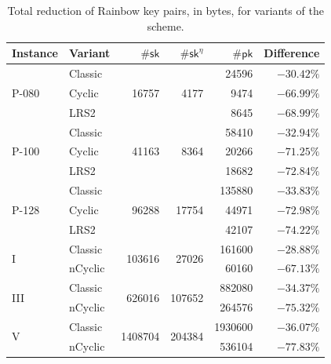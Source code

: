 \documentclass[english]{ufsc-thesis-rn46-2019/ufsc-thesis-rn46-2019}
\theoremstyle{definition}
\begin{document}
\begin{table}[htbp]
  \renewcommand{\arraystretch}{1.2}
  \centering
  \caption{Total reduction of Rainbow key pairs, in bytes, for variants of the
    scheme.}\label{tab:pair-diff}
  \begin{tabular}{*{2}{l}*{4}{r}}
    \toprule
    Instance               & Variant & $\#\mathsf{sk}$
      & $\#\mathsf{sk}^{\eta}$         & $\#\mathsf{pk}$ & Difference \\
    \midrule
    \multirow{3}{*}{P-080} & Classic & \multirow{3}{*}{\num{  16757}}
      & \multirow{3}{*}{\num{   4177}} & \num{   24596}  & $-30.42\%$ \\
                           & Cyclic  &
      &                                & \num{    9474}  & $-66.99\%$ \\
                           & LRS2    &
      &                                & \num{    8645}  & $-68.99\%$ \\
    \multirow{3}{*}{P-100} & Classic & \multirow{3}{*}{\num{  41163}}
      & \multirow{3}{*}{\num{   8364}} & \num{   58410}  & $-32.94\%$ \\
                           & Cyclic  &
      &                                & \num{   20266}  & $-71.25\%$ \\
                           & LRS2    &
      &                                & \num{   18682}  & $-72.84\%$ \\
    \multirow{3}{*}{P-128} & Classic & \multirow{3}{*}{\num{  96288}}
      & \multirow{3}{*}{\num{  17754}} & \num{  135880}  & $-33.83\%$ \\
                           & Cyclic  &
      &                                & \num{   44971}  & $-72.98\%$ \\
                           & LRS2    &
      &                                & \num{   42107}  & $-74.22\%$ \\
    \multirow{2}{*}{I    } & Classic & \multirow{2}{*}{\num{ 103616}}
      & \multirow{2}{*}{\num{  27026}} & \num{  161600}  & $-28.88\%$ \\
                           & nCyclic &
      &                                & \num{   60160}  & $-67.13\%$ \\
    \multirow{2}{*}{III  } & Classic & \multirow{2}{*}{\num{ 626016}}
      & \multirow{2}{*}{\num{ 107652}} & \num{  882080}  & $-34.37\%$ \\
                           & nCyclic &
      &                                & \num{  264576}  & $-75.32\%$ \\
    \multirow{2}{*}{V    } & Classic & \multirow{2}{*}{\num{1408704}}
      & \multirow{2}{*}{\num{ 204384}} & \num{ 1930600}  & $-36.07\%$ \\
                           & nCyclic &
      &                                & \num{  536104}  & $-77.83\%$ \\
    \bottomrule
  \end{tabular}
\end{table}
\end{document}
